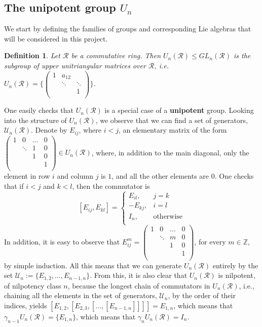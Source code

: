 \documentclass[12pt]{article}
\newtheorem{definition}[theorem]{Definition}
\begin{document}
\subsection{The unipotent group $U_n$}
We start by defining the families of groups and corresponding Lie algebras that will be considered in this project.
\begin{definition}
\label{def.unipotent.matrix}
Let $\mathcal{R}$ be a commutative ring. Then $U_n(\mathcal{R})\leq GL_n(\mathcal{R})$ is the subgroup of upper unitriangular matrices over $\mathcal{R}$, i.e. $U_n(\mathcal{R})=\Bigg\{
\begin{pmatrix}
1 & a_{12} &\\
  & \ddots & \ddots\\
  & & 1\\
\end{pmatrix}\Bigg\}$.
\end{definition}
 One easily checks that $U_n(\mathcal{R})$ is a special case of a \textbf{unipotent} group.
Looking into the structure of $U_n(\mathcal{R})$, we observe that we can find a set of generators, $\mathcal{U}_n(\mathcal{R})$. Denote by $E_{ij}$, where $i<j$, an elementary matrix of the form $\begin{pmatrix}
1 & 0 & \dots & 0\\
  & \ddots & 1 & 0\\
  &  & 1 & 0\\
  & & & 1\\
  \end{pmatrix}\in U_n(\mathcal{R})$, where, in addition to the main diagonal, only the element in row $i$ and column $j$ is $1$, and all the other elements are $0$. One checks that if $i<j$ and $k<l$, then the commutator is \[
  [E_{ij},E_{kl}]=\begin{cases}
    E_{il}, & j=k\\
    -E_{kj}, & {i=l}\\
    I_n, & \text{otherwise}\\
    \end{cases}
    \]
  In addition, it is easy to observe that $E_{ij}^m=\begin{pmatrix}
1 & 0 & \dots & 0\\
  & \ddots & m & 0\\
  &  & 1 & 0\\
  & & & 1\\
  \end{pmatrix}$, for every $m\in\mathbb{Z}$, by simple induction.
All this means that we can generate $U_n(\mathcal{R})$ entirely by the set $\mathcal{U}_n:=\{E_{1,2},\dots,E_{n-1,n}\}$. From this, it is also clear that $U_n(\mathcal{R})$ is nilpotent, of nilpotency class $n$, because the longest chain of commutators in $U_n(\mathcal{R})$, i.e., chaining all the elements in the set of generators, $\mathcal{U}_n$, by the order of their indices, yields $[E_{1,2},[E_{2,3},[\dots,[E_{n-1,n}]]]]=E_{1,n}$, which means that $\gamma_{n-1}U_n(\mathcal{R})=\{E_{1,n}\}$, which means that $\gamma_n U_n(\mathcal{R})=I_n$.\par
\end{document}
